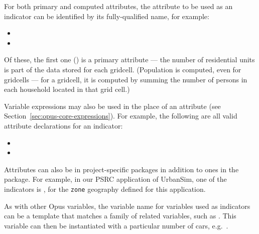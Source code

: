 For both primary \primaryattributesindex and computed attributes,
\computedattributesindex the attribute \attributesindex to be used as an
indicator \indicatorsindex can be identified by its fully-qualified name,
for example:

\begin{itemize}
\tight
\item {}
\item {}
\end{itemize}

Of these, the first one () is a
primary \primaryattributesindex attribute --- the number of residential
units is part of the data stored for each gridcell. 
\computedattributesindex (Population is computed, even for
gridcells --- for a gridcell, it is computed by summing the number of
persons in each household located in that grid cell.) 

Variable expressions may also be used in the place of an attribute 
(see Section~\ref{sec:opus-core-expressions}). For example, the following are
all valid attribute declarations for an indicator: 

\begin{itemize}
\tight
\item {}
\item {}
\end{itemize}

Attributes \attributesindex can also be in project-specific packages in
addition to ones in the  package.  For example, in our
PSRC \psrcindex application of UrbanSim, one of the indicators
\indicatorsindex is
, for the
\verb|zone| geography defined for this application.

As with other Opus variables, \variablesindex the variable \variablesindex
name for variables \variablesindex used as indicators \indicatorsindex can
be a template that matches a family of related variables, \variablesindex
such as .  This variable
\variablesindex can then be instantiated with a particular number of cars,
e.g.\ .

